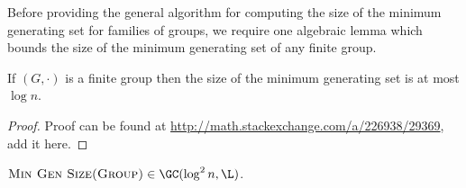 \documentclass{article}
\begin{document}
Before providing the general algorithm for computing the size of the minimum generating set for families of groups, we require one algebraic lemma which bounds the size of the minimum generating set of any finite group.

\begin{lemma}\label{lem:log}
  If $(G, \cdot)$ is a finite group then the size of the minimum generating set is at most $\log n$.
\end{lemma}
\begin{proof}
  Proof can be found at \url{http://math.stackexchange.com/a/226938/29369}, add it here.
\end{proof}

\begin{lemma}\label{lem:mingengc}
  $\textsc{Min Gen Size(Group)} \in \GC(\log^2 n, \L)$.
\end{lemma}
\end{document}
